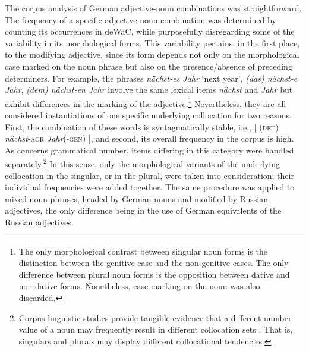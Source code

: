 The corpus analysis of German adjective-noun combinations was straightforward. The frequency of a specific adjective-noun combination was determined by counting its occurrences in deWaC, while purposefully disregarding some of the variability in its morphological forms. This variability pertains, in the first place, to the modifying adjective, since its form depends not only on the morphological case marked on the noun phrase but also on the presence/absence of preceding determiners. For example, the phrases \textit{nächst-es Jahr} `next year', \textit{(das) nächst-e Jahr}, \textit{(dem) nächst-en Jahr} involve the same lexical items \textit{nächst} and \textit{Jahr} but exhibit differences in the marking of the adjective.\footnote{The only morphological contrast between singular noun forms is the distinction between the genitive case and the non-genitive cases. The only difference between plural noun forms is the opposition between dative and non-dative forms. Nonetheless, case marking on the noun was also discarded.} Nevertheless, they are all considered instantiations of one specific underlying collocation for two reasons. First, the combination of these words is syntagmatically stable, i.e., $[$ {(\textsc{det}) \textit{nächst}-\textsc{agr}} \textit{Jahr}(-\textsc{gen}) $]$, and second, its overall frequency in the corpus is high. As concerns grammatical number, items differing in this category were handled separately.\footnote{Corpus linguistic studies provide tangible evidence that a different number value of a noun may frequently result in different collocation sets \citep[e.g.,][167--172]{sinclair2003}. That is, singulars and plurals may display different collocational tendencies.} In this sense, only the morphological variants of the underlying collocation in the singular, or in the plural, were taken into consideration; their individual frequencies were added together. The same procedure was applied to mixed noun phrases, headed by German nouns and modified by Russian adjectives, the only difference being in the use of German equivalents of the Russian adjectives.


